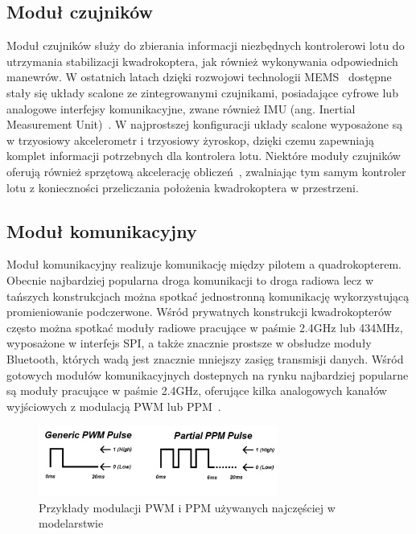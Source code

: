 \subsection{Moduł czujników}

Moduł czujników służy do zbierania informacji niezbędnych kontrolerowi lotu do utrzymania stabilizacji kwadrokoptera, jak również wykonywania odpowiednich manewrów. W ostatnich latach dzięki rozwojowi technologii MEMS~\cite{mems1} dostępne stały się układy scalone ze zintegrowanymi czujnikami, posiadające cyfrowe lub analogowe interfejsy komunikacyjne, zwane również IMU (ang. Inertial Measurement Unit)~\cite{mems2}. W najprostszej konfiguracji układy scalone wyposażone są w trzyosiowy akcelerometr i trzyosiowy żyroskop, dzięki czemu zapewniają komplet informacji potrzebnych dla kontrolera lotu. Niektóre moduły czujników oferują również sprzętową akcelerację obliczeń~\cite{ds_mpu6050}, zwalniając tym samym kontroler lotu z konieczności przeliczania położenia kwadrokoptera w przestrzeni. 

\subsection{Moduł komunikacyjny}

Moduł komunikacyjny realizuje komunikację między pilotem a quadrokopterem. Obecnie najbardziej popularna droga komunikacji to droga radiowa lecz w tańszych konstrukcjach można spotkać jednostronną komunikację wykorzystującą promieniowanie podczerwone. Wśród prywatnych konstrukcji kwadrokopterów często można spotkać moduły radiowe pracujące w paśmie 2.4GHz lub 434MHz, wyposażone w interfejs SPI, a także znacznie prostsze w obsłudze moduły Bluetooth, których wadą jest znacznie mniejszy zasięg transmisji danych. Wśród gotowych modułów komunikacyjnych dostepnych na rynku najbardziej popularne są moduły pracujące w paśmie 2.4GHz, oferujące kilka analogowych kanałów wyjściowych z modulacją PWM lub PPM~\cite{quadro16,quadro17,quadro18,quadro19}. 

\begin{figure}[H]
	\centering
		\includegraphics[width=0.7\textwidth]{Pictures/quadrotor_controller_pwm_ppm.png}
	\caption[Przykłady modulacji w modelarstwie]{Przykłady modulacji PWM i PPM używanych najczęściej w modelarstwie}
	\label{fig:quadrotor_modules.png}
\end{figure}

